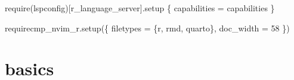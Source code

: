 \documentclass[
  letterpaper,
  DIV=11,
  numbers=noendperiod,
  oneside]{scrartcl}
\newenvironment{Shaded}{\begin{snugshade}}{\end{snugshade}}
\newcommand{\ErrorTok}[1]{\textcolor[rgb]{0.68,0.00,0.00}{#1}}
\newcommand{\ExtensionTok}[1]{\textcolor[rgb]{0.00,0.23,0.31}{#1}}
\newcommand{\KeywordTok}[1]{\textcolor[rgb]{0.00,0.23,0.31}{#1}}
\newcommand{\NormalTok}[1]{\textcolor[rgb]{0.00,0.23,0.31}{#1}}
\newcommand{\StringTok}[1]{\textcolor[rgb]{0.13,0.47,0.30}{#1}}
\begin{document}
\begin{Shaded}
\begin{Highlighting}[]
  \ExtensionTok{require}\ErrorTok{(}\StringTok{\textquotesingle{}lspconfig\textquotesingle{}}\KeywordTok{)}\ExtensionTok{[}\StringTok{\textquotesingle{}r\_language\_server\textquotesingle{}}\ExtensionTok{].setup}\NormalTok{ \{}
    \ExtensionTok{capabilities}\NormalTok{ = capabilities}
  \KeywordTok{\}}

\ExtensionTok{require}\StringTok{\textquotesingle{}cmp\_nvim\_r\textquotesingle{}}\ExtensionTok{.setup}\ErrorTok{(}\KeywordTok{\{}
  \ExtensionTok{filetypes}\NormalTok{ = \{}\StringTok{\textquotesingle{}r\textquotesingle{}}\NormalTok{, }\StringTok{\textquotesingle{}rmd\textquotesingle{}}\NormalTok{, }\StringTok{\textquotesingle{}quarto\textquotesingle{}}\NormalTok{\},}
  \ExtensionTok{doc\_width}\NormalTok{ = 58}
  \KeywordTok{\})}
\end{Highlighting}
\end{Shaded}

\hypertarget{basics}{%
\section{basics}\label{basics}}
\end{document}
